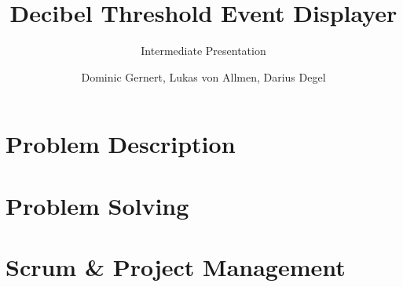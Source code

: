 \documentclass[authorontitle=true]{bfhbeamer}
\title{Decibel Threshold Event Displayer}
\subtitle{Intermediate Presentation}
\author{Dominic Gernert, Lukas von Allmen, Darius Degel}
\begin{document}
    \maketitle
    
    \section{Problem Description}
    
    \section{Problem Solving}
    
    \section{Scrum \& Project Management}
    
\end{document}
